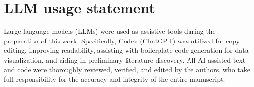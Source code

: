 \label{sec:main-end}
\section*{LLM usage statement}
Large language models (LLMs) were used as assistive tools during the preparation of this work.
Specifically, Codex (ChatGPT) was utilized for copy-editing, improving readability, assisting with boilerplate code generation for data visualization, and aiding in preliminary literature discovery.
All AI-assisted text and code were thoroughly reviewed, verified, and edited by the authors, who take full responsibility for the accuracy and integrity of the entire manuscript.
